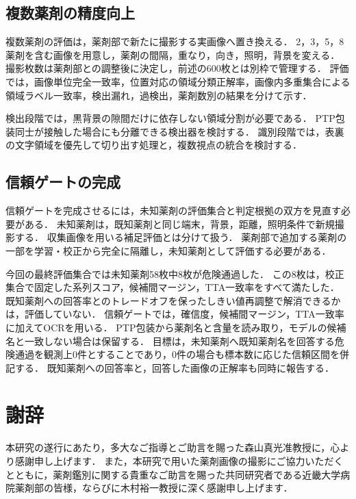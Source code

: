 \documentclass[uplatex,dvipdfmx]{jsarticle}
\begin{document}
\subsection{複数薬剤の精度向上}

複数薬剤の評価は，薬剤部で新たに撮影する実画像へ置き換える．
2，3，5，8薬剤を含む画像を用意し，薬剤の間隔，重なり，向き，照明，背景を変える．
撮影枚数は薬剤部との調整後に決定し，前述の600枚とは別枠で管理する．
評価では，画像単位完全一致率，位置対応の領域分類正解率，画像内多重集合による領域ラベル一致率，検出漏れ，過検出，薬剤数別の結果を分けて示す．

検出段階では，黒背景の隙間だけに依存しない領域分割が必要である．
PTP包装同士が接触した場合にも分離できる検出器を検討する．
識別段階では，表裏の文字領域を優先して切り出す処理と，複数視点の統合を検討する．

\subsection{信頼ゲートの完成}

信頼ゲートを完成させるには，未知薬剤の評価集合と判定根拠の双方を見直す必要がある．
未知薬剤は，既知薬剤と同じ端末，背景，距離，照明条件で新規撮影する．
収集画像を用いる補足評価とは分けて扱う．
薬剤部で追加する薬剤の一部を学習・校正から完全に隔離し，未知薬剤として評価する必要がある．

今回の最終評価集合では未知薬剤58枚中8枚が危険通過した．
この8枚は，校正集合で固定した系列スコア，候補間マージン，TTA一致率をすべて満たした．
既知薬剤への回答率とのトレードオフを保ったしきい値再調整で解消できるかは，評価していない．
信頼ゲートでは，確信度，候補間マージン，TTA一致率に加えてOCRを用いる．
PTP包装から薬剤名と含量を読み取り，モデルの候補名と一致しない場合は保留する．
目標は，未知薬剤へ既知薬剤名を回答する危険通過を観測上0件とすることであり，0件の場合も標本数に応じた信頼区間を併記する．
既知薬剤への回答率と，回答した画像の正解率も同時に報告する．

\clearpage

\section*{謝辞}

本研究の遂行にあたり，多大なご指導とご助言を賜った森山真光准教授に，心より感謝申し上げます．
また，本研究で用いた薬剤画像の撮影にご協力いただくとともに，薬剤鑑別に関する貴重なご助言を賜った共同研究者である近畿大学病院薬剤部の皆様，ならびに木村裕一教授に深く感謝申し上げます．
\end{document}

